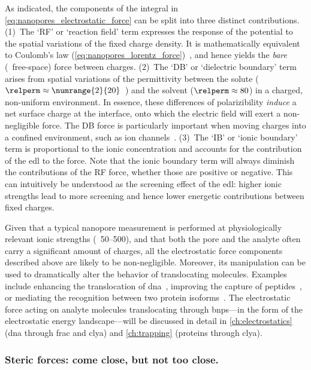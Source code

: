 %
As indicated, the components of the integral in \cref{eq:nanopores_electrostatic_force} can be split into
three distinct contributions. (1)~The `RF' or `reaction field' term expresses the response of the potential to
the spatial variations of the fixed charge density. It is mathematically equivalent to Coulomb's law
(\cref{eq:nanopores_lorentz_force})~\cite{Im-1998}, and hence yields the \emph{bare} (\ie~free-space) force
between charges. (2)~The `DB' or `dielectric boundary' term arises from spatial variations of the permittivity
between the solute ($\relperm \approx \text{\numrange{2}{20}}$~\cite{Li-2013}) and the solvent ($\relperm
\approx 80$) in a charged, non-uniform environment. In essence, these differences of polarizibility
\emph{induce} a net surface charge at the interface, onto which the electric field will exert a non-negligible
force. The DB force is particularly important when moving charges into a confined environment, such as ion
channels~\cite{Nadler-2003}. (3)~The `IB' or `ionic boundary' term is proportional to the ionic concentration
and accounts for the contribution of the \gls{edl} to the force. Note that the ionic boundary term will always
diminish the contributions of the RF force, whether those are positive or negative. This can intuitively be
understood as the screening effect of the \gls{edl}: higher ionic strengths lead to more screening and hence
lower energetic contributions between fixed charges.

Given that a typical nanopore measurement is performed at physiologically relevant ionic strengths
(\eg~\SIrange{50}{500}{\mM}), and that both the pore and the analyte often carry a significant amount of
charges, all the electrostatic force components described above are likely to be non-negligible. Moreover, its
manipulation can be used to dramatically alter the behavior of translocating molecules. Examples include
enhancing the translocation of \gls{dna}~\cite{Maglia-2008}, improving the capture of
peptides~\cite{Asandei-2015b,Asandei-2016}, or mediating the recognition between two protein
isoforms~\cite{Fahie-2015b}. The electrostatic force acting on analyte molecules translocating through
\glspl{bnp}---in the form of the electrostatic energy landscape---will be discussed in detail in
\cref{ch:electrostatics} (\gls{dna} through \gls{frac} and \gls{clya}) and \cref{ch:trapping} (proteins
through \gls{clya}).


\subsubsection{Steric forces: come close, but not too close.}
%

